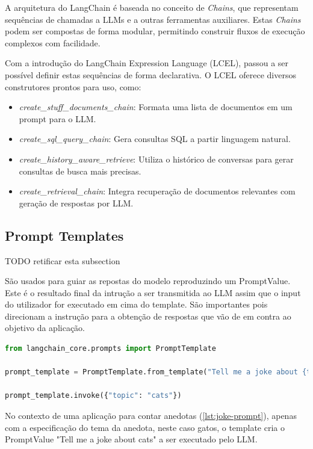 A arquitetura do LangChain é baseada no conceito de \textit{Chains}, que representam sequências de chamadas a LLMs e a outras ferramentas auxiliares. Estas \textit{Chains} podem ser compostas de forma modular, permitindo construir fluxos de execução complexos com facilidade.

Com a introdução do LangChain Expression Language (LCEL), passou a ser possível definir estas sequências de forma declarativa. O LCEL oferece diversos construtores prontos para uso, como:

\begin{itemize}
	\item \textit{create\_stuff\_documents\_chain}: Formata uma lista de documentos em um prompt para o LLM.
	\item \textit{create\_sql\_query\_chain}: Gera consultas SQL a partir linguagem natural.
	\item \textit{create\_history\_aware\_retrieve}: Utiliza o histórico de conversas para gerar consultas de busca mais precisas.
	\item \textit{create\_retrieval\_chain}: Integra recuperação de documentos relevantes com geração de respostas por LLM.
\end{itemize}

\subsection{Prompt Templates} TODO retificar esta subsection

São usados para guiar as repostas do modelo reproduzindo um PromptValue. Este é o resultado final da intrução a ser transmitida ao LLM assim que o input do utilizador for executado em cima do template. São importantes pois direcionam a instrução para a obtenção de respostas que vão de em contra ao objetivo da aplicação. 


\begin{lstlisting}[language=Python, caption={Using LangChain to create a prompt template}, label={lst:joke-prompt}]
from langchain_core.prompts import PromptTemplate

prompt_template = PromptTemplate.from_template("Tell me a joke about {topic}")

prompt_template.invoke({"topic": "cats"})
\end{lstlisting}

No contexto de uma aplicação para contar anedotas (\ref{lst:joke-prompt}), apenas com a especificação do tema da anedota, neste caso gatos, o template cria o PromptValue "Tell me a joke about cats"  a ser executado pelo LLM.


